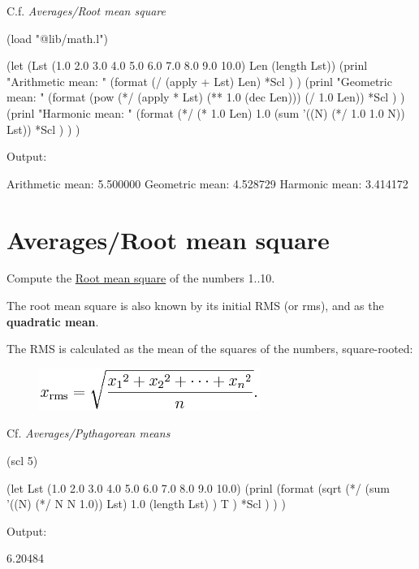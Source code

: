 C.f. \emph{Averages/Root mean square}


\begin{wideverbatim}

(load "@lib/math.l")

(let (Lst (1.0 2.0 3.0 4.0 5.0 6.0 7.0 8.0 9.0 10.0)  Len (length Lst))
   (prinl "Arithmetic mean: "
      (format
         (/ (apply + Lst) Len)
         *Scl ) )
   (prinl "Geometric mean: "
      (format
         (pow (*/ (apply * Lst) (** 1.0 (dec Len))) (/ 1.0 Len))
         *Scl ) )
   (prinl "Harmonic mean: "
      (format
         (*/ (* 1.0 Len) 1.0 (sum '((N) (*/ 1.0 1.0 N)) Lst))
         *Scl ) ) )

Output:

Arithmetic mean: 5.500000
Geometric mean: 4.528729
Harmonic mean: 3.414172

\end{wideverbatim}

\pagebreak{}
\section*{Averages/Root mean square}

Compute the \href{http://en.wikipedia.org/wiki/Root\_mean\_square}{Root
mean square} of the numbers 1..10.

The root mean square is also known by its initial RMS (or rms), and as
the \textbf{quadratic mean}.

The RMS is calculated as the mean of the squares of the numbers,
square-rooted:

\begin{figure}[H]
\centering
\includegraphics[scale=.6]{graphics/cf22c76e0c33c4fb96262638a28bd52b.png}
\end{figure}

Cf. \emph{Averages/Pythagorean means}


\begin{wideverbatim}

(scl 5)

(let Lst (1.0 2.0 3.0 4.0 5.0 6.0 7.0 8.0 9.0 10.0)
   (prinl
      (format
         (sqrt
            (*/
               (sum '((N) (*/ N N 1.0)) Lst)
               1.0
               (length Lst) )
            T )
         *Scl ) ) )

Output:

6.20484

\end{wideverbatim}

